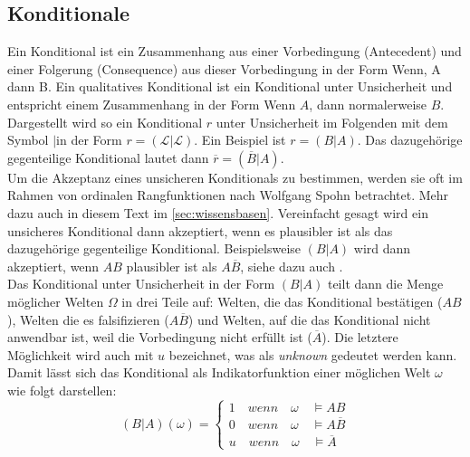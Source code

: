 \documentclass[12pt,a4paper]{article}
\newcommand{\lag}{\mathcal{L}}
\begin{document}
\subsection{Konditionale}
Ein Konditional ist ein Zusammenhang aus einer Vorbedingung (Antecedent) und einer Folgerung (Consequence) aus dieser Vorbedingung in der Form \glqq Wenn, A dann B\grqq . Ein qualitatives Konditional ist ein Konditional unter Unsicherheit und entspricht einem Zusammenhang in der Form \glqq Wenn $A$, dann normalerweise $B$\grqq . Dargestellt wird so ein Konditional $r$ unter Unsicherheit im Folgenden mit dem Symbol \glqq$|$\grqq \space in der Form $r = ( \lag | \lag)$. Ein Beispiel ist $r = (B|A)$. Das dazugehörige gegenteilige Konditional lautet dann $\overline{r} = (\overline{B}|A)$.\\
Um die Akzeptanz eines unsicheren Konditionals zu bestimmen, werden sie oft im Rahmen von ordinalen Rangfunktionen nach Wolfgang Spohn betrachtet. Mehr dazu auch in diesem Text im  \autoref{sec:wissensbasen}. Vereinfacht gesagt wird ein unsicheres Konditional dann  akzeptiert, wenn es plausibler ist als das dazugehörige gegenteilige Konditional. Beispielsweise $(B|A)$ wird  dann akzeptiert, wenn $A B$ plausibler ist als $A \overline{B}$, siehe dazu auch \cite{isberner14}. \\
Das Konditional unter Unsicherheit in der Form $(B|A)$ teilt dann die Menge möglicher Welten $\Omega$ in drei Teile auf: Welten, die das Konditional bestätigen ($A B$), Welten die es falsifizieren ($A \overline{B}$) und Welten, auf die das Konditional nicht anwendbar ist, weil die Vorbedingung nicht erfüllt ist ($\overline{A}$). Die letztere Möglichkeit wird auch mit $u$ bezeichnet, was als \textit{unknown} gedeutet werden kann. Damit lässt sich das Konditional als Indikatorfunktion einer möglichen Welt $\omega$ wie folgt darstellen:
\[
  (B|A)(\omega)=\begin{cases}
               1 \quad wenn \quad \omega \quad \models AB\\
               0 \quad wenn \quad \omega \quad \models A\overline{B}\\
               u \quad wenn \quad \omega \quad \models \overline{A}
            \end{cases}
\]
\end{document}
